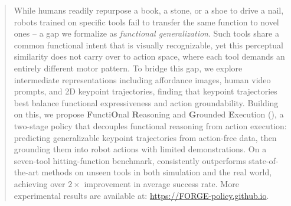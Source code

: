 \begin{abstract}
While humans readily repurpose a book, a stone, or a shoe to drive a nail, robots trained on specific tools fail to transfer the same function to novel ones -- a gap we formalize as \textit{functional generalization}. Such tools share a common functional intent that is visually recognizable, yet this perceptual similarity does not carry over to action space, where each tool demands an entirely different motor pattern. To bridge this gap, we explore intermediate representations including affordance images, human video prompts, and 2D keypoint trajectories, finding that keypoint trajectories best balance functional expressiveness and action groundability. Building on this, we propose \textbf{F}uncti\textbf{O}nal \textbf{R}easoning and \textbf{G}rounded \textbf{E}xecution (\algoname{}), a two-stage policy that decouples functional reasoning from action execution: predicting generalizable keypoint trajectories from action-free data, then grounding them into robot actions with limited demonstrations. On a seven-tool hitting-function benchmark, \algoname{} consistently outperforms state-of-the-art methods on unseen tools in both simulation and the real world, achieving over $2\times$ improvement in average success rate. More experimental results are available at: \url{https://FORGE-policy.github.io}.
\end{abstract}




